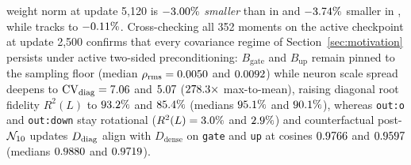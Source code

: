 \begin{enumerate}
  weight norm at update 5{,}120 is $-3.00\%$
  \emph{smaller} than \muont{} in \mlpdiag{} and $-3.74\%$
  smaller in \dense{}, while \nullmlp{} tracks \muont{} to
  $-0.11\%$. Cross-checking all 352 moments on the active
  \dense{} checkpoint at update 2{,}500 confirms that every covariance regime of
  Section~\ref{sec:motivation} persists under active two-sided preconditioning:
  $B_{\text{gate}}$ and $B_{\text{up}}$ remain pinned to the sampling floor
  (median $\rho_{\mathrm{rms}} = 0.0050{}$ and
  $0.0092{}$) while neuron scale spread deepens to
  $\mathrm{CV}_{\operatorname{diag}} = 7.06{}$ and $5.07{}$
  ($278.3\times$ max-to-mean), raising diagonal root fidelity
  $R^2(L)$ to $93.2\%$ and $85.4\%$ (medians
  $95.1\%$ and $90.1\%$), whereas
  \texttt{out:o} and \texttt{out:down} stay rotational ($R^2(L) =
  3.0\%$ and $2.9\%$) and counterfactual
  post-$\mathcal{N}_{10}$ updates $D_{\operatorname{diag}}$ align with $D_{\text{dense}}$ on
  \texttt{gate} and \texttt{up} at cosines $0.9766{}$ and
  $0.9597{}$ (medians $0.9880{}$ and
  $0.9719{}$).
\end{enumerate}

